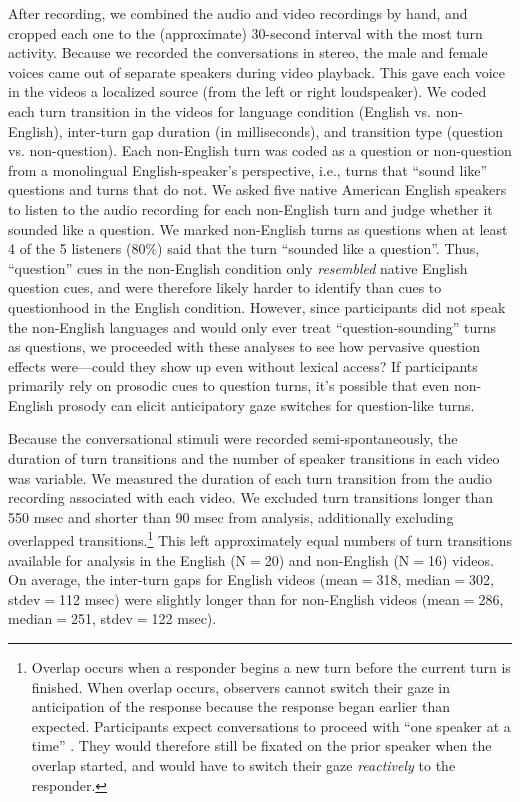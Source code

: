 \documentclass[authoryear, 12pt]{elsarticle}
\begin{document}
After recording, we combined the audio and video recordings by hand, and cropped each one to the (approximate) 30-second interval with the most turn activity. Because we recorded the conversations in stereo, the male and female voices came out of separate speakers during video playback. This gave each voice in the videos a localized source (from the left or right loudspeaker). We coded each turn transition in the videos for language condition (English vs. non-English), inter-turn gap duration (in milliseconds), and transition type (question vs. non-question). Each non-English turn was coded as a question or non-question from a monolingual English-speaker's perspective, i.e., turns that ``sound like'' questions and turns that do not. We asked five native American English speakers to listen to the audio recording for each non-English turn and judge whether it sounded like a question. We marked non-English turns as questions when at least 4 of the 5 listeners (80\%) said that the turn ``sounded like a question''. Thus, ``question'' cues in the non-English condition only \textit{resembled} native English question cues, and were therefore likely harder to identify than cues to questionhood in the English condition. However, since participants did not speak the non-English languages and would only ever treat ``question-sounding'' turns as questions, we proceeded with these analyses to see how pervasive question effects were---could they show up even without lexical access? If participants primarily rely on prosodic cues to question turns, it's possible that even non-English prosody can elicit anticipatory gaze switches for question-like turns.

Because the conversational stimuli were recorded semi-spontaneously, the duration of turn transitions and the number of speaker transitions in each video was variable. We measured the duration of each turn transition from the audio recording associated with each video. We excluded turn transitions longer than 550 msec and shorter than 90 msec from analysis, additionally excluding overlapped transitions.\footnote{Overlap occurs when a responder begins a new turn before the current turn is finished. When overlap occurs, observers cannot switch their gaze in anticipation of the response because the response began earlier than expected. Participants expect conversations to proceed with ``one speaker at a time'' \citep{sacks1974}. They would therefore still be fixated on the prior speaker when the overlap started, and would have to switch their gaze \textit{reactively} to the responder.} This left approximately equal numbers of turn transitions available for analysis in the English (N$=$20) and non-English (N$=$16) videos. On average, the inter-turn gaps for English videos (mean$=$318, median$=$302, stdev$=$112 msec) were slightly longer than for non-English videos (mean$=$286, median$=$251, stdev$=$122 msec).
\end{document}
